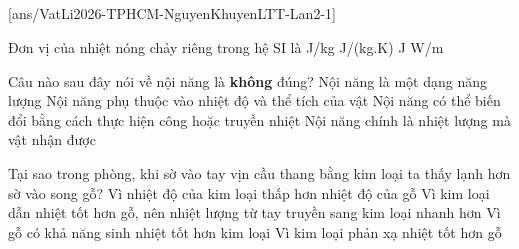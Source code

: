 
	\noindent
	\subsection*{}
	\setcounter{ex}{0}
	[ans/VatLi2026-TPHCM-NguyenKhuyenLTT-Lan2-1]

	\begin{ex}%
		Đơn vị của nhiệt nóng chảy riêng trong hệ SI là
		\choice
		{\True J/kg}
		{J/(kg.K)}
		{J}
		{W/m}
	\end{ex}

	\begin{ex}%
		Câu nào sau đây nói về nội năng là \textbf{không} đúng?
		\choice
		{Nội năng là một dạng năng lượng}
		{Nội năng phụ thuộc vào nhiệt độ và thể tích của vật}
		{Nội năng có thể biến đổi bằng cách thực hiện công hoặc truyền nhiệt}
		{\True Nội năng chính là nhiệt lượng mà vật nhận được}
	\end{ex}

	\begin{ex}%
		Tại sao trong phòng, khi sờ vào tay vịn cầu thang bằng kim loại ta thấy lạnh hơn sờ vào song gỗ?
		\choice
		{Vì nhiệt độ của kim loại thấp hơn nhiệt độ của gỗ}
		{\True Vì kim loại dẫn nhiệt tốt hơn gỗ, nên nhiệt lượng từ tay truyền sang kim loại nhanh hơn}
		{Vì gỗ có khả năng sinh nhiệt tốt hơn kim loại}
		{Vì kim loại phản xạ nhiệt tốt hơn gỗ}
	\end{ex}

